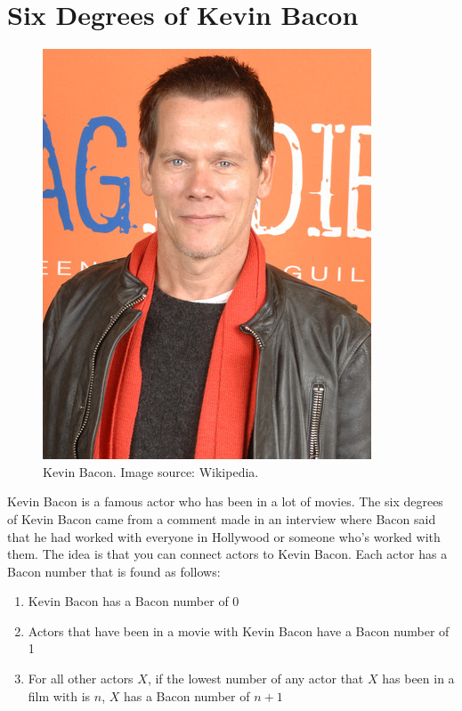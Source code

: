 \section*{Six Degrees of Kevin Bacon}
\begin{figure}[h]
\includegraphics[scale = .4]{Kevin_Bacon.jpg}
\caption{Kevin Bacon.  Image source: Wikipedia.}
\end{figure}

Kevin Bacon is a famous actor who has been in a lot of movies. The six degrees of Kevin Bacon came from a comment made in an interview where Bacon said that he had worked with everyone in Hollywood or someone who's worked with them.  The idea is that you can connect actors to Kevin Bacon. Each actor has a Bacon number that is found as follows:
\begin{enumerate}
\item Kevin Bacon has a Bacon number of 0
\item Actors that have been in a movie with Kevin Bacon have a Bacon number of 1
\item For all other actors $X$, if the lowest number of any actor that $X$ has been in a film with is $n$, $X$ has a Bacon number of $n+1$
\end{enumerate}

